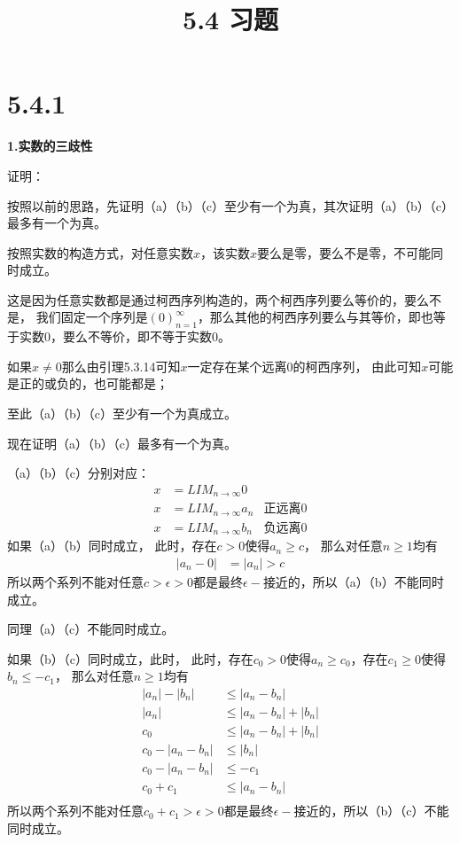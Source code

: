 \documentclass{article}
\theoremstyle{mystyle}
\begin{document}
\title{5.4 习题}
\maketitle

\section*{5.4.1}

\textbf{1.实数的三歧性}

证明：

按照以前的思路，先证明（a）（b）（c）至少有一个为真，其次证明（a）（b）（c）最多有一个为真。

按照实数的构造方式，对任意实数$x$，该实数$x$要么是零，要么不是零，不可能同时成立。

这是因为任意实数都是通过柯西序列构造的，两个柯西序列要么等价的，要么不是，
我们固定一个序列是$(0)_{n=1}^\infty$，那么其他的柯西序列要么与其等价，即也等于实数0，要么不等价，即不等于实数0。

如果$x \neq 0$那么由引理5.3.14可知$x$一定存在某个远离0的柯西序列，
由此可知$x$可能是正的或负的，也可能都是；

至此（a）（b）（c）至少有一个为真成立。

现在证明（a）（b）（c）最多有一个为真。

（a）（b）（c）分别对应：
\begin{align}
  x & = LIM_{n \rightarrow \infty}0                 \\
  x & = LIM_{n \rightarrow \infty}a_n & \text{正远离0} \\
  x & = LIM_{n \rightarrow \infty}b_n & \text{负远离0}
\end{align}
如果（a）（b）同时成立，
此时，存在$c>0$使得$a_n \geq c$，
那么对任意$n \geq 1$均有
\begin{align*}
  |a_n - 0| & = |a_n| > c
\end{align*}
所以两个系列不能对任意$c > \epsilon > 0$都是最终$\epsilon -$接近的，所以（a）（b）不能同时成立。

同理（a）（c）不能同时成立。

如果（b）（c）同时成立，此时，
此时，存在$c_0>0$使得$a_n \geq c_0$，存在$c_1 \geq 0$使得$b_n \leq -c_1$，
那么对任意$n \geq 1$均有
\begin{align*}
  |a_n| - |b_n|     & \leq |a_n - b_n|          \\
  |a_n|             & \leq |a_n - b_n|  + |b_n| \\
  c_0               & \leq |a_n - b_n| + |b_n|  \\
  c_0 - |a_n - b_n| & \leq |b_n|                \\
  c_0 - |a_n - b_n| & \leq -c_1                 \\
  c_0 + c_1         & \leq |a_n - b_n|          \\
\end{align*}
所以两个系列不能对任意$c_0 + c_1 > \epsilon > 0$都是最终$\epsilon -$接近的，所以（b）（c）不能同时成立。
\end{document}
